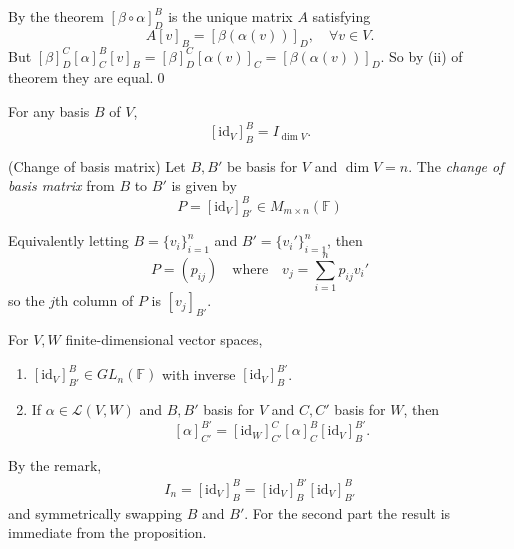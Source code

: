 \documentclass{article}
\newcommand{\F}{\mathbb{F}}
\begin{document}
\pf By the theorem $ [\beta\circ\alpha]^B_D $ is the unique matrix $ A $ satisfying
\[
	A[v]_B=[\beta(\alpha(v))]_D,\quad \forall v\in V.
\]
But $ [\beta]^C_D[\alpha]^B_C[v]_B=[\beta]^C_D[\alpha(v)]_C=[\beta(\alpha(v))]_D $. So by (ii) of theorem they are equal.\qed
\begin{remark}
  For any basis $ B $ of $ V $,
  \[
	  [\mathrm{id}_V]^B_B=I_{\dim V}.
  \]
\end{remark}
\begin{definition}
	(Change of basis matrix) Let $ B,B' $ be basis for $ V $ and $ \dim V=n $. The \textit{change of basis matrix} from $ B $ to $ B' $ is given by
	\[
		P=[\mathrm{id}_V]^B_{B'}\in M_{m\times n}(\F)
	\]
\end{definition}
Equivalently letting $ B=\{v_i\}_{i=1}^n $ and $ B'=\{v_i'\}_{i=1}^n $, then
\[
	P=(p_{ij})\quad\text{where}\quad v_j=\sum_{i=1}^n p_{ij}v_i'
\]
so the $ j $th column of $ P $ is $ [v_j]_{B'} $.
\begin{proposition}
	For $ V,W $ finite-dimensional vector spaces,\smallskip
  \begin{enumerate}
	  \item $ [\mathrm{id}_V]^B_{B'}\in GL_n(\F) $ with inverse $ [\mathrm{id}_V]^{B'}_B $.
	  \item If $ \alpha\in\mathcal L(V,W) $ and $ B,B' $ basis for $ V $ and $ C,C' $ basis for $ W $, then
		  \[
			  [\alpha]^{B'}_{C'}=[\mathrm{id}_W]^C_{C'}[\alpha]^B_C[\mathrm{id}_V]^{B'}_B.
		  \]
  \end{enumerate}
\end{proposition}
\pf By the remark,
\begin{align*}
	I_n=[\mathrm{id}_V]^B_B=[\mathrm{id}_V]^{B'}_B[\mathrm{id}_V]^B_{B'}
\end{align*}
and symmetrically swapping $ B $ and $ B' $. For the second part the result is immediate from the proposition.
\end{document}
